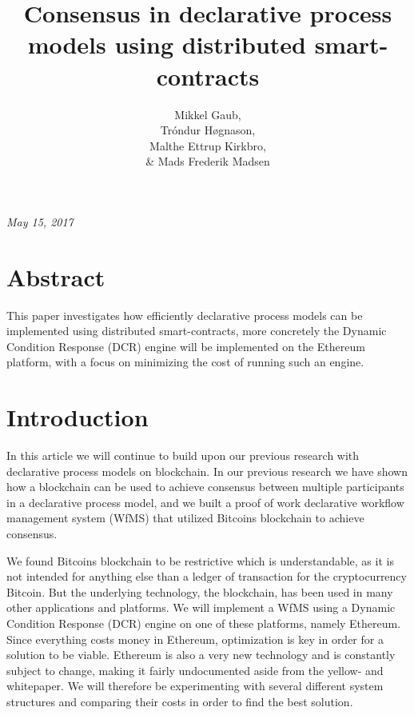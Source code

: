 \documentclass{article}
\title{Consensus in declarative process models using distributed smart-contracts}
\author{Mikkel Gaub, \\ Tróndur Høgnason, \\ Malthe Ettrup Kirkbro, \\ \& Mads Frederik Madsen }
\date{}
\begin{document}
\normalem
	\begin{titlepage}
		\maketitle		
		\hspace{-18pt}
		\textit{May 15, 2017}
		\vspace{\fill}
		\section*{Abstract}
		This paper investigates how efficiently declarative process models can be implemented using distributed smart-contracts, more concretely the Dynamic Condition Response (DCR) engine will be implemented on the Ethereum platform, with a focus on minimizing the cost of running such an engine.
		\thispagestyle{empty}
	\end{titlepage}
	\clearpage

	\setcounter{page}{1}

	\setcounter{tocdepth}{2}
	\tableofcontents
	\pagebreak

	\section{Introduction}
	In this article we will continue to build upon our previous research with declarative process models on blockchain. 
	In our previous research we have shown how a blockchain can be used to achieve consensus between multiple participants in a declarative process model, and we built a proof of work declarative workflow management system (WfMS) that utilized Bitcoins blockchain to achieve consensus.
 
	We found Bitcoins blockchain to be restrictive which is understandable, as it is not intended for anything else than a ledger of transaction for the cryptocurrency Bitcoin. 
	But the underlying technology, the blockchain, has been used in many other applications and platforms. 
	We will implement a WfMS using a Dynamic Condition Response (DCR) engine on one of these platforms, namely Ethereum.
	Since everything costs money in Ethereum, optimization is key in order for a solution to be viable.
	Ethereum is also a very new technology and is constantly subject to change, making it fairly undocumented aside from the yellow- and whitepaper.
	We will therefore be experimenting with several different system structures and comparing their costs in order to find the best solution.
\end{document}

